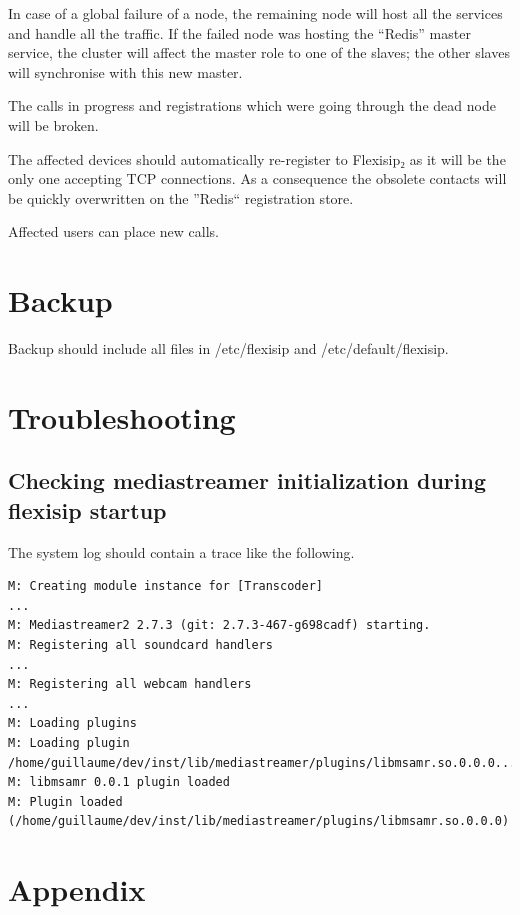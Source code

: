\documentclass[a4paper,10pt]{article}
\begin{document}
In case of a global failure of a node, the remaining node will host all the services and handle all the traffic.
If the failed node was hosting the ``Redis'' master service, the cluster will affect the master role to one of the slaves;
the other slaves will synchronise with this new master.

The calls in progress and registrations which were going through the dead node will be broken.

The affected devices should automatically re-register to Flexisip₂ as it will be the only one accepting TCP connections.
As a consequence the obsolete contacts will be quickly overwritten on the ''Redis`` registration store.

Affected users can place new calls.



\section{Backup}


Backup should include all files in /etc/flexisip and /etc/default/flexisip.




\section{Troubleshooting}
\subsection{Checking mediastreamer initialization during flexisip startup}
The system log should contain a trace like the following.

\begin{verbatim}
M: Creating module instance for [Transcoder]
...
M: Mediastreamer2 2.7.3 (git: 2.7.3-467-g698cadf) starting.
M: Registering all soundcard handlers
...
M: Registering all webcam handlers
...
M: Loading plugins
M: Loading plugin /home/guillaume/dev/inst/lib/mediastreamer/plugins/libmsamr.so.0.0.0...
M: libmsamr 0.0.1 plugin loaded
M: Plugin loaded (/home/guillaume/dev/inst/lib/mediastreamer/plugins/libmsamr.so.0.0.0)
\end{verbatim}


\section{Appendix}

\appendix
\end{document}
